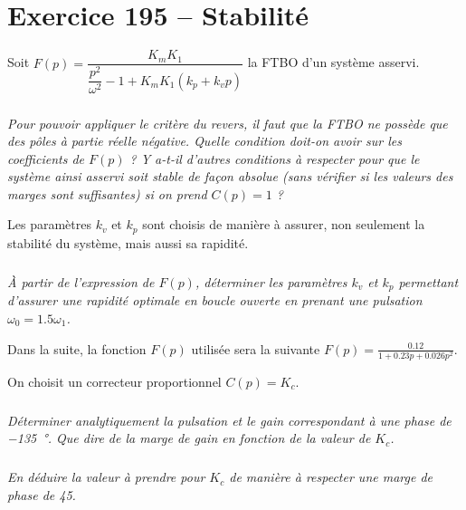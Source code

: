 \section*{Exercice 195 -- Stabilité}


Soit $F(p)=\dfrac{K_mK_1}{\dfrac{p^2}{\omega^2}-1+K_m K_1 \left(k_p +k_v p\right)} $ la FTBO d'un système asservi.

\subparagraph{}\textit{Pour pouvoir appliquer le critère du revers, il faut que la FTBO ne possède que des pôles à partie réelle négative. Quelle condition doit-on avoir sur les coefficients de $F(p)$ ? Y a-t-il d'autres conditions à respecter pour que le système ainsi asservi soit stable de façon absolue (sans vérifier si les valeurs des marges sont suffisantes) si on prend $C(p)=1$ ?}

Les paramètres $k_v$ et $k_p$ sont choisis de manière à assurer, non seulement la stabilité du système, mais aussi sa rapidité.

\subparagraph{}\textit{\`A partir de l'expression de $F(p)$, déterminer les paramètres $k_v$ et $k_p$ permettant d'assurer une rapidité optimale en boucle ouverte en prenant une pulsation $\omega_0=\num{1.5} \omega_1$. }


Dans la suite, la fonction $F(p)$ utilisée sera la suivante $F(p)=\frac{\num{0.12}}{1+\num{0.23} p + \num{0.026} p^2}$.

On choisit un correcteur proportionnel $C(p)=K_c$.


\subparagraph{}\textit{Déterminer analytiquement la pulsation et le gain correspondant à une phase de \SI{-135}{\degree}. Que dire de la marge de gain en fonction de la valeur de $K_c$.}

\subparagraph{}\textit{En déduire la valeur à prendre pour $K_c$ de manière à respecter une marge de phase de 45\degres.}


